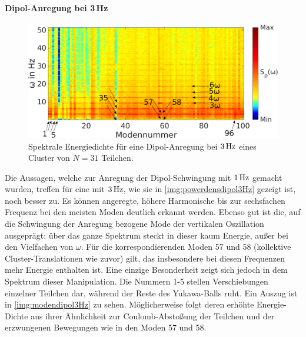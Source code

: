 \documentclass[numbers=noenddot,a4paper,notitlepage,twoside,BCOR15mm]{scrbook}
\begin{document}
						\paragraph{Dipol-Anregung bei 3\,Hz}

							\begin{figure}[!b]
								\centering
								\includegraphics[width=\textwidth]{figs/auswertung/manipulation/dipol3Hzpowerdens.png}
								\caption{Spektrale Energiedichte für eine Dipol-Anregung  bei $\unit[3]{Hz}$ eines Cluster von $N=31$ Teilchen.}\label{img:powerdensdipol3Hz}
							\end{figure}

						Die Aussagen, welche zur Anregung der Dipol-Schwingung mit $\unit[1]{Hz}$ gemacht wurden, treffen für eine mit $\unit[3]{Hz}$, wie sie in \autoref{img:powerdensdipol3Hz} gezeigt ist, noch besser zu. Es können angeregte, höhere Harmonische bis zur sechsfachen Frequenz bei den meisten Moden deutlich erkannt werden. Ebenso gut ist die, auf die Schwingung der Anregung bezogene Mode der vertikalen Oszillation ausgeprägt: über das ganze Spektrum steckt in dieser kaum Energie, außer bei den Vielfachen von $\omega$. Für die korrespondierenden Moden 57 und 58 (kollektive Cluster-Translationen wie zuvor) gilt, das insbesondere bei diesen Frequenzen mehr Energie enthalten ist. Eine einzige Besonderheit zeigt sich jedoch in dem Spektrum dieser Manipulation. Die Nummern 1-5 stellen Verschiebungen einzelner Teilchen dar, während der Reste des Yukawa-Balls ruht. Ein Auszug ist in \autoref{img:modendipol3Hz} zu sehen. Möglicherweise folgt deren erhöhte Energie-Dichte aus ihrer Ähnlichkeit zur Coulomb-Abstoßung der Teilchen und der erzwungenen Bewegungen wie in den Moden 57 und 58.
\end{document}
